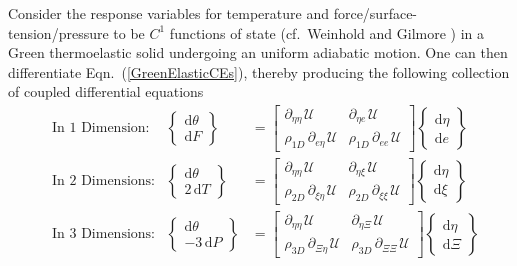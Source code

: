 Consider the response variables for temperature and force\slash surface-tension\slash pressure to be $C^1$ functions of state (cf.\ Weinhold \cite{Weinhold75c} and Gilmore \cite{Gilmore84}) in a Green thermo\-elastic solid undergoing an uniform adiabatic motion.  One can then differentiate Eqn.~(\ref{GreenElasticCEs}), thereby producing the following collection of coupled differential equations
\begin{subequations}
    \label{GreenElasticODEs}
    \begin{align}
    \mbox{} & \text{In 1 Dimension:} &
    \left\{ \begin{matrix} \mathrm{d} \theta \\ 
    \mathrm{d} F \end{matrix} \right\} & = \begin{bmatrix}
    \partial_{\eta\eta\,} \mathcal{U} & \partial_{\eta e\,} \mathcal{U} \\
    \rho_{1D} \, \partial_{e\eta\,} \mathcal{U} & \rho_{1D} \, \partial_{ee\,} \mathcal{U} \end{bmatrix} 
    \left\{ \begin{matrix} \mathrm{d} \eta \\
    \mathrm{d} e \end{matrix} \right\} \\
    \mbox{} & \text{In 2 Dimensions:} &
    \left\{ \begin{matrix} \mathrm{d} \theta \\ 
    2 \, \mathrm{d} T \end{matrix} \right\} & = \begin{bmatrix}
    \partial_{\eta\eta\,} \mathcal{U} & \partial_{\eta \xi\,} \mathcal{U} \\
    \rho_{2D} \, \partial_{\xi\eta\,} \mathcal{U} & \rho_{2D} \, \partial_{\xi\xi\,} \mathcal{U} \end{bmatrix} \left\{ \begin{matrix} \mathrm{d} \eta \\
    \mathrm{d} \xi \end{matrix} \right\} \label{GreenMembrane} \\
    \mbox{} & \text{In 3 Dimensions:} &
    \left\{ \begin{matrix} \mathrm{d} \theta \\ 
    -3 \, \mathrm{d} P \end{matrix} \right\} & = \begin{bmatrix}
    \partial_{\eta\eta\,} \mathcal{U} & \partial_{\eta \Xi\,} \mathcal{U} \\
    \rho_{3D} \, \partial_{\Xi\eta\,} \mathcal{U} & \rho_{3D} \, \partial_{\Xi\Xi\,} \mathcal{U} \end{bmatrix} \left\{ \begin{matrix} \mathrm{d} \eta \\
    \mathrm{d} \Xi \end{matrix} \right\}
    \end{align}
\end{subequations}
